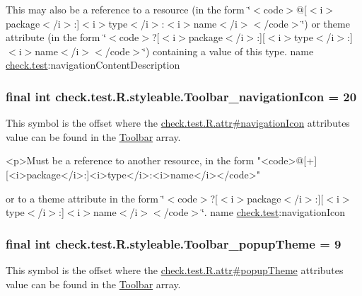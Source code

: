 This may also be a reference to a resource (in the form \char`\"{}$<$code$>$@\mbox{[}$<$i$>$package$<$/i$>$\+:\mbox{]}$<$i$>$type$<$/i$>$\+:$<$i$>$name$<$/i$>$$<$/code$>$\char`\"{}) or theme attribute (in the form \char`\"{}$<$code$>$?\mbox{[}$<$i$>$package$<$/i$>$\+:\mbox{]}\mbox{[}$<$i$>$type$<$/i$>$\+:\mbox{]}$<$i$>$name$<$/i$>$$<$/code$>$\char`\"{}) containing a value of this type.  name \hyperlink{namespacecheck_1_1test}{check.\+test}\+:navigation\+Content\+Description \hypertarget{classcheck_1_1test_1_1_r_1_1styleable_a991bcba8e01110fe04b1c4f26bbfccc9}{}
\subsubsection[{Toolbar\+\_\+navigation\+Icon}]{\setlength{\rightskip}{0pt plus 5cm}final int check.\+test.\+R.\+styleable.\+Toolbar\+\_\+navigation\+Icon = 20\hspace{0.3cm}{\ttfamily [static]}}\label{classcheck_1_1test_1_1_r_1_1styleable_a991bcba8e01110fe04b1c4f26bbfccc9}
This symbol is the offset where the \hyperlink{classcheck_1_1test_1_1_r_1_1attr_a180a79b5b65a4ebfd7e0f2e70c5a231a}{check.\+test.\+R.\+attr\#navigation\+Icon} attribute\textquotesingle{}s value can be found in the \hyperlink{classcheck_1_1test_1_1_r_1_1styleable_a1a7fa90223693abef77e7484cca2df54}{Toolbar} array.

\begin{DoxyVerb}      <p>Must be a reference to another resource, in the form "<code>@[+][<i>package</i>:]<i>type</i>:<i>name</i></code>"
\end{DoxyVerb}
 or to a theme attribute in the form \char`\"{}$<$code$>$?\mbox{[}$<$i$>$package$<$/i$>$\+:\mbox{]}\mbox{[}$<$i$>$type$<$/i$>$\+:\mbox{]}$<$i$>$name$<$/i$>$$<$/code$>$\char`\"{}.  name \hyperlink{namespacecheck_1_1test}{check.\+test}\+:navigation\+Icon \hypertarget{classcheck_1_1test_1_1_r_1_1styleable_a731a060d7a21c9b47869e797b622fce9}{}
\subsubsection[{Toolbar\+\_\+popup\+Theme}]{\setlength{\rightskip}{0pt plus 5cm}final int check.\+test.\+R.\+styleable.\+Toolbar\+\_\+popup\+Theme = 9\hspace{0.3cm}{\ttfamily [static]}}\label{classcheck_1_1test_1_1_r_1_1styleable_a731a060d7a21c9b47869e797b622fce9}
This symbol is the offset where the \hyperlink{classcheck_1_1test_1_1_r_1_1attr_a80b43c587b8929227394e17102b18eb4}{check.\+test.\+R.\+attr\#popup\+Theme} attribute\textquotesingle{}s value can be found in the \hyperlink{classcheck_1_1test_1_1_r_1_1styleable_a1a7fa90223693abef77e7484cca2df54}{Toolbar} array.

